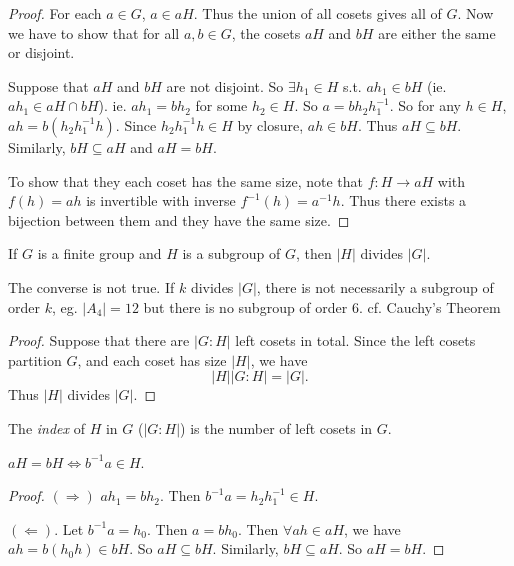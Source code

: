 \documentclass[a4paper]{article}
\begin{document}
  \begin{proof}
    For each $a\in G$, $a\in aH$. Thus the union of all cosets gives all of $G$. Now we have to show that for all $a, b\in G$, the cosets $aH$ and $bH$ are either the same or disjoint.

    Suppose that $aH$ and $bH$ are not disjoint. So $\exists h_1\in H$ s.t. $ah_1\in bH$ (ie. $ah_1\in aH\cap bH$). ie. $ah_1 = bh_2$ for some $h_2\in H$. So $a = bh_2h_1^{-1}$. So for any $h\in H$, $ah = b(h_2h_1^{-1}h)$. Since $h_2h_1^{-1}h\in H$ by closure, $ah\in bH$. Thus $aH\subseteq bH$. Similarly, $bH\subseteq aH$ and $aH = bH$.

    To show that they each coset has the same size, note that $f: H \to aH$ with $f(h) = ah$ is invertible with inverse $f^{-1}(h) = a^{-1}h$. Thus there exists a bijection between them and they have the same size.
  \end{proof}

  \begin{thm}
    If $G$ is a finite group and $H$ is a subgroup of $G$, then $|H|$ divides $|G|$.
  \end{thm}
  \note The converse is not true. If $k$ divides $|G|$, there is not necessarily a subgroup of order $k$, eg. $|A_4| = 12$ but there is no subgroup of order $6$. cf. Cauchy's Theorem

  \begin{proof}
    Suppose that there are $|G: H|$ left cosets in total. Since the left cosets partition $G$, and each coset has size $|H|$, we have
    \[
      |H||G:H| = |G|.
    \]
    Thus $|H|$ divides $|G|$.
  \end{proof}

  \begin{defi}
    The \emph{index} of $H$ in $G$ ($|G:H|$) is the number of left cosets in $G$. 
  \end{defi}

  \begin{prop}
    $aH = bH \Leftrightarrow b^{-1}a\in H$.
  \end{prop}
  \begin{proof}
    $(\Rightarrow)$ $ah_1 = bh_2$. Then $b^{-1}a = h_2h_1^{-1}\in H$.

    $(\Leftarrow)$. Let $b^{-1}a = h_0$. Then $a = bh_0$. Then $\forall ah\in aH$, we have $ah = b(h_0h)\in bH$. So $aH \subseteq bH$. Similarly, $bH\subseteq aH$. So $aH = bH$.
  \end{proof}
\end{document}
